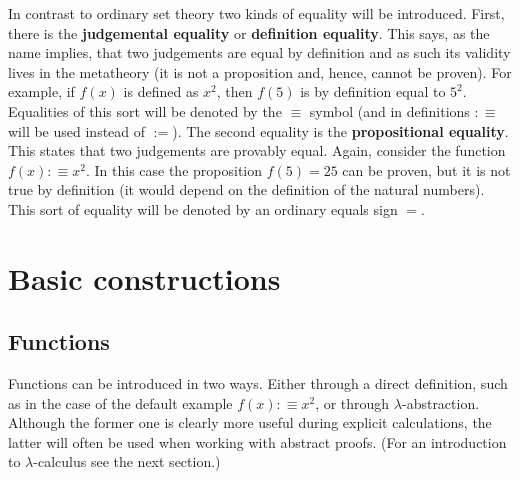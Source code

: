     In contrast to ordinary set theory two kinds of equality will be introduced. First, there is the \textbf{judgemental equality} or \textbf{definition equality}. This says, as the name implies, that two judgements are equal by definition and as such its validity lives in the metatheory (it is not a proposition and, hence, cannot be proven). For example, if $f(x)$ is defined as $x^2$, then $f(5)$ is by definition equal to $5^2$. Equalities of this sort will be denoted by the $\equiv$ symbol (and in definitions $:\equiv$ will be used instead of $:=$). The second equality is the \textbf{propositional equality}. This states that two judgements are provably equal. Again, consider the function $f(x):\equiv x^2$. In this case the proposition $f(5)=25$ can be proven, but it is not true by definition (it would depend on the definition of the natural numbers). This sort of equality will be denoted by an ordinary equals sign $=$.

\section{Basic constructions}
\subsection{Functions}

    Functions can be introduced in two ways. Either through a direct definition, such as in the case of the default example $f(x):\equiv x^2$, or through $\lambda$-abstraction. Although the former one is clearly more useful during explicit calculations, the latter will often be used when working with abstract proofs. (For an introduction to $\lambda$-calculus see the next section.)

